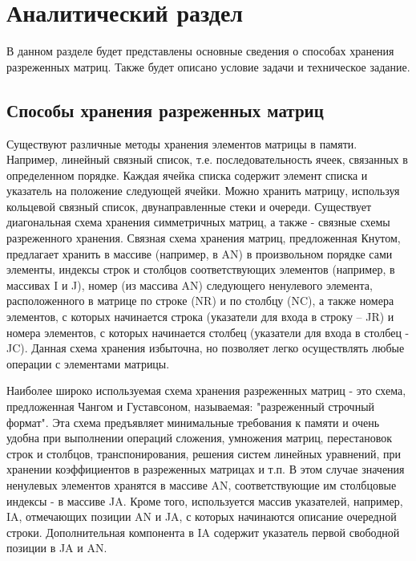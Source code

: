 \chapter{Аналитический раздел}

В данном разделе будет представлены основные сведения о способах хранения разреженных матриц. Также будет описано условие задачи и техническое задание.

\section{Способы хранения разреженных матриц}

Существуют различные методы хранения элементов матрицы в памяти. Например, линейный связный список, т.е. последовательность ячеек, связанных 
в определенном порядке. Каждая ячейка списка содержит элемент списка и указатель 
на  положение  следующей  ячейки.  Можно  хранить  матрицу,  используя  кольцевой 
связный список, двунаправленные стеки и очереди. Существует диагональная схема 
хранения  симметричных  матриц,  а  также  -  связные  схемы  разреженного  хранения. 
Связная схема хранения матриц, предложенная Кнутом, предлагает хранить в массиве 
(например, в AN) в произвольном порядке сами элементы, индексы строк и столбцов 
соответствующих  элементов  (например,  в  массивах  I  и  J),  номер  (из  массива  AN) 
следующего  ненулевого  элемента,  расположенного  в  матрице  по  строке  (NR)  и  по 
столбцу (NC), а также номера элементов, с которых начинается строка (указатели для 
входа в строку –  JR) и номера элементов, с которых начинается столбец (указатели 
для  входа  в  столбец  -  JC).  Данная  схема  хранения  избыточна,  но  позволяет  легко 
осуществлять любые операции с элементами матрицы.  

Наиболее  широко  используемая  схема  хранения  разреженных  матриц  -  это 
схема, предложенная Чангом и Густавсоном, называемая: "разреженный строчный 
формат". Эта схема предъявляет минимальные требования к памяти и очень удобна 
при  выполнении  операций  сложения,  умножения  матриц,  перестановок  строк  и 
столбцов, транспонирования, решения систем линейных уравнений, при хранении 
коэффициентов в разреженных матрицах и т.п. 
В  этом  случае  значения  ненулевых  элементов  хранятся  в  массиве  AN, 
соответствующие им столбцовые индексы -  в массиве JA. Кроме того, используется 
массив  указателей,  например, IA,  отмечающих  позиции  AN и  JA,  с  которых 
начинаются описание очередной строки. Дополнительная компонента в IA  содержит 
указатель первой свободной позиции в JA и AN.

